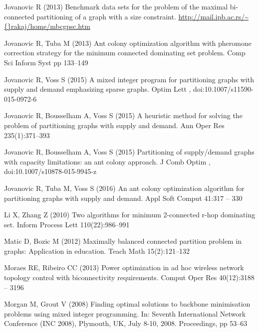 \begin{thebibliography}{38}
Jovanovic R (2013) Benchmark data sets for the problem of the maximal
  bi-connected partitioning of a graph with a size constraint.
  \urlprefix\url{http://mail.ipb.ac.rs/\~{}rakaj/home/mbcgpsc.htm}

Jovanovic R, Tuba M (2013) Ant colony optimization algorithm with pheromone
  correction strategy for the minimum connected dominating set problem. Comp
  Sci Inform Syst pp 133--149

Jovanovic R, Voss S (2015) A mixed integer program for partitioning graphs with
  supply and demand emphasizing sparse graphs. Optim Lett ,
  doi:10.1007/s11590-015-0972-6

Jovanovic R, Bousselham A, Voss S (2015{}) A heuristic method for
  solving the problem of partitioning graphs with supply and demand. Ann Oper
  Res 235(1):371--393

Jovanovic R, Bousselham A, Voss S (2015{}) Partitioning of
  supply/demand graphs with capacity limitations: an ant colony approach. J
  Comb Optim , doi:10.1007/s10878-015-9945-z

Jovanovic R, Tuba M, Voss S (2016) An ant colony optimization algorithm for
  partitioning graphs with supply and demand. Appl Soft Comput 41:317 -- 330

Li X, Zhang Z (2010) Two algorithms for minimum 2-connected r-hop dominating
  set. Inform Process Lett 110(22):986--991

Matic D, Bozic M (2012) Maximally balanced connected partition problem in
  graphs: Application in education. Teach Math 15(2):121--132

Moraes RE, Ribeiro CC (2013) Power optimization in ad hoc wireless network
  topology control with biconnectivity requirements. Comput Oper Res
  40(12):3188 -- 3196

Morgan M, Grout V (2008) Finding optimal solutions to backbone minimisation
  problems using mixed integer programming. In: Seventh International Network
  Conference {(INC} 2008), Plymouth, UK, July 8-10, 2008. Proceedings, pp
  53--63


\end{thebibliography}
